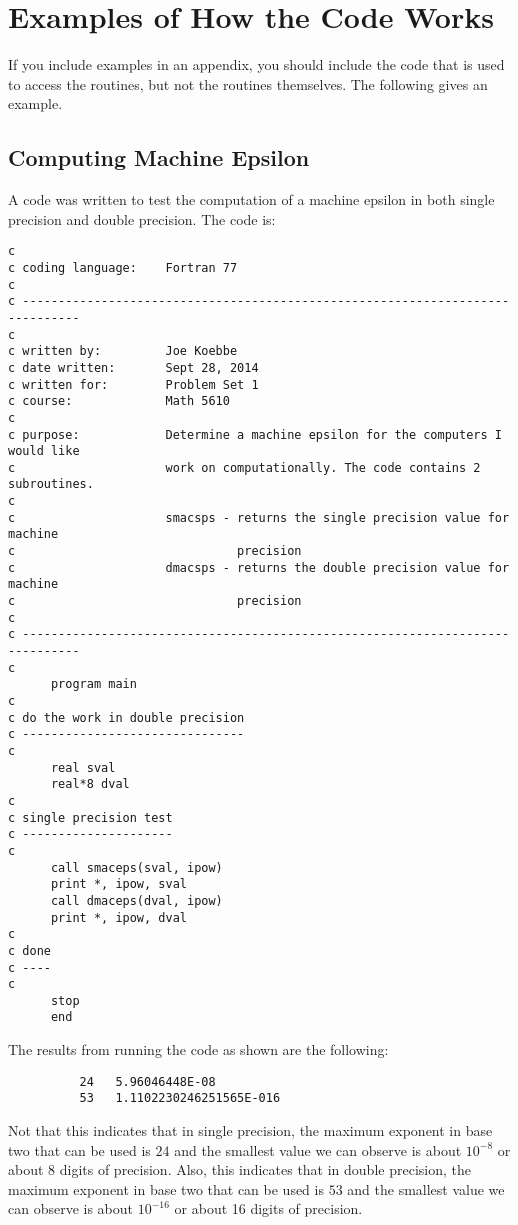 
\section{\bf Examples of How the Code Works}

If you include examples in an appendix, you should include the code that is
used to access the routines, but not the routines themselves. The following
gives an example.

\subsection{Computing Machine Epsilon}

A code was written to test the computation of a machine epsilon in both single
precision and double precision. The code is:

\begin{verbatim}
c
c coding language:    Fortran 77
c
c ------------------------------------------------------------------------------
c
c written by:         Joe Koebbe
c date written:       Sept 28, 2014
c written for:        Problem Set 1
c course:             Math 5610
c
c purpose:            Determine a machine epsilon for the computers I would like
c                     work on computationally. The code contains 2 subroutines.
c
c                     smacsps - returns the single precision value for machine
c                               precision
c                     dmacsps - returns the double precision value for machine
c                               precision
c
c ------------------------------------------------------------------------------
c
      program main
c
c do the work in double precision
c -------------------------------
c
      real sval
      real*8 dval
c
c single precision test
c ---------------------
c
      call smaceps(sval, ipow)
      print *, ipow, sval
      call dmaceps(dval, ipow)
      print *, ipow, dval
c
c done
c ----
c
      stop
      end
\end{verbatim}

The results from running the code as shown are the following:

\begin{verbatim}
          24   5.96046448E-08
          53   1.1102230246251565E-016
\end{verbatim}

Not that this indicates that in single precision, the maximum exponent in base
two that can be used is $24$ and the smallest value we can observe is about
$10^{-8}$ or about 8 digits of precision. Also, this indicates that in double
precision, the maximum exponent in base two that can be used is $53$ and the
smallest value we can observe is about $10^{-16}$ or about 16 digits of
precision.
